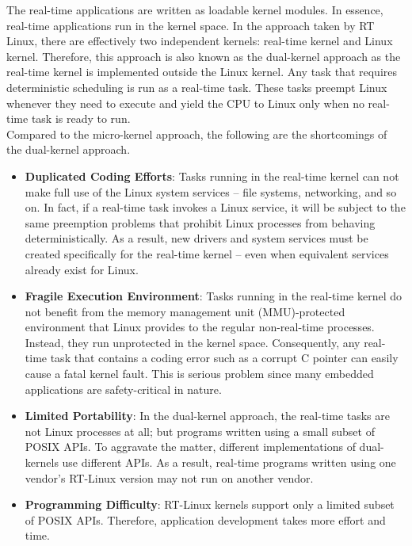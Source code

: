 \documentclass[12pt]{report}
\begin{document}
The real-time applications are written as loadable kernel modules. In essence, real-time applications run in the kernel space. In the approach taken by RT Linux, there are effectively two independent kernels: real-time kernel and Linux kernel. Therefore, this approach is also known as the dual-kernel approach as the real-time kernel is implemented outside the Linux kernel. Any task that requires deterministic scheduling is run as a real-time task. These tasks preempt Linux whenever they need to execute and yield the CPU to Linux only when no real-time task is ready to run.\\ 

Compared to the micro-kernel approach, the following are the shortcomings of the dual-kernel approach.
\begin{itemize}
    \item \textbf{Duplicated Coding Efforts}: Tasks running in the real-time kernel can not make full use of the Linux system services – file systems, networking, and so on. In fact, if a real-time task invokes a Linux service, it will be subject to the same preemption problems that prohibit Linux processes from behaving deterministically. As a result, new drivers and system services must be created specifically for the real-time kernel – even when equivalent services already exist for Linux.
    \item \textbf{Fragile Execution Environment}: Tasks running in the real-time kernel do not benefit from the memory management unit (MMU)-protected environment that Linux provides to the regular non-real-time processes. Instead, they run unprotected in the kernel space. Consequently, any real-time task that contains a coding error such as a corrupt C pointer can easily cause a fatal kernel fault. This is serious problem since many embedded applications are safety-critical in nature.
    \item \textbf{Limited Portability}: In the dual-kernel approach, the real-time tasks are not Linux processes at all; but programs written using a small subset of POSIX APIs. To aggravate the matter, different implementations of dual-kernels use different APIs. As a result, real-time programs written using one vendor's RT-Linux version may not run on another vendor.
    \item \textbf{Programming Difficulty}: RT-Linux kernels support only a limited subset of POSIX APIs. Therefore, application development takes more effort and time. 
\end{itemize}
\end{document}
